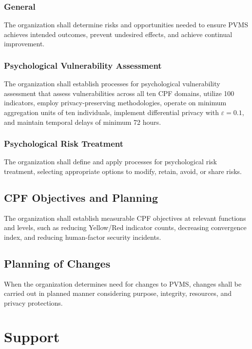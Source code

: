 \documentclass[11pt,a4paper]{article}
\begin{document}
\subsubsection{General}

The organization shall determine risks and opportunities needed to ensure PVMS achieves intended outcomes, prevent undesired effects, and achieve continual improvement.

\subsubsection{Psychological Vulnerability Assessment}

The organization shall establish processes for psychological vulnerability assessment that assess vulnerabilities across all ten CPF domains, utilize 100 indicators, employ privacy-preserving methodologies, operate on minimum aggregation units of ten individuals, implement differential privacy with $\varepsilon = 0.1$, and maintain temporal delays of minimum 72 hours.

\subsubsection{Psychological Risk Treatment}

The organization shall define and apply processes for psychological risk treatment, selecting appropriate options to modify, retain, avoid, or share risks.

\subsection{CPF Objectives and Planning}

The organization shall establish measurable CPF objectives at relevant functions and levels, such as reducing Yellow/Red indicator counts, decreasing convergence index, and reducing human-factor security incidents.

\subsection{Planning of Changes}

When the organization determines need for changes to PVMS, changes shall be carried out in planned manner considering purpose, integrity, resources, and privacy protections.

\section{Support}
\end{document}
